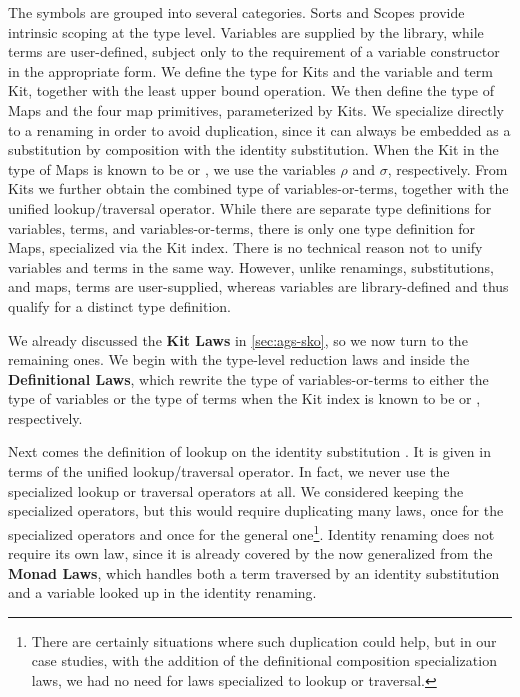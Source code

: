\documentclass[screen,nonacm]{acmart}
\begin{document}
The symbols are grouped into several categories. Sorts and Scopes provide
intrinsic scoping at the type level. Variables are supplied by the library,
while terms are user-defined, subject only to the requirement of a variable
constructor in the appropriate form. We define the type for Kits and the
variable and term Kit, together with the least upper bound operation. We then
define the type of Maps and the four map primitives, parameterized by Kits. We
specialize  directly to a renaming in order to avoid
duplication, since it can always be embedded as a substitution by composition
with the identity substitution. When the Kit in the type of Maps is known to be
 or , we use the variables $\rho$ and $\sigma$,
respectively. From Kits we further obtain the combined type of
variables-or-terms, together with the unified lookup/traversal operator. While
there are separate type definitions for variables, terms, and
variables-or-terms, there is only one type definition for Maps, specialized via
the Kit index. There is no technical reason not to unify variables and terms in
the same way. However, unlike renamings, substitutions, and maps, terms are
user-supplied, whereas variables are library-defined and thus qualify for a
distinct type definition.

We already discussed the \textbf{Kit Laws} in \cref{sec:ags-sko}, so we now
turn to the remaining ones. We begin with the type-level reduction laws
 and  inside the \textbf{Definitional
      Laws}, which rewrite the type of variables-or-terms to either the type of
variables or the type of terms when the Kit index is known to be
 or , respectively.

Next comes the definition of lookup on the identity substitution
. It is given in terms of the unified lookup/traversal
operator. In fact, we never use the specialized lookup or traversal operators
at all. We considered keeping the specialized operators, but this would require
duplicating many laws, once for the specialized operators and once for the
general one\footnote{There are certainly situations where such duplication
      could help, but in our case studies, with the addition of the definitional
      composition specialization laws, we had no need for laws specialized to lookup
      or traversal.}. Identity renaming does not require its own law, since it is
already covered by the now generalized  from the
\textbf{Monad Laws}, which handles both a term traversed by an identity
substitution and a variable looked up in the identity renaming.
\end{document}
